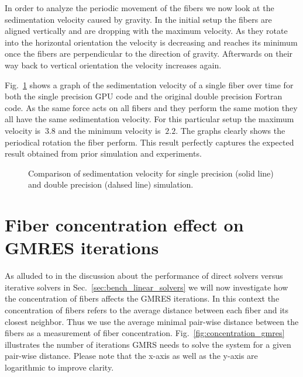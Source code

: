 In order to analyze the periodic movement of the fibers we now look at the sedimentation velocity caused by gravity. In the initial setup the fibers are aligned vertically and are dropping with the maximum velocity. As they rotate into the horizontal orientation the velocity is decreasing and reaches its minimum once the fibers are perpendicular to the direction of gravity. Afterwards on their way back to vertical orientation the velocity increases again.

Fig.~\ref{fig:ring_sedimentation_velocity} shows a graph of the sedimentation velocity of a single fiber over time for both the single precision GPU code and the original double precision Fortran code. As the same force acts on all fibers and they perform the same motion they all have the same sedimentation velocity. For this particular setup the maximum velocity is $~3.8$ and the minimum velocity is $~2.2$. The graphs clearly shows the periodical rotation the fiber perform. This result perfectly captures the expected result obtained from prior simulation and experiments.

\begin{figure}[!htbp]
  \centering
  \caption[Comparison of sedimentation velocity for single- and double-precision simulation.]{Comparison of sedimentation velocity for single precision (solid line) and double precision (dahsed line) simulation.}
  \label{fig:ring_sedimentation_velocity}
\end{figure}

\section{Fiber concentration effect on GMRES iterations}
\label{sec:example_concentration_gmres}

As alluded to in the discussion about the performance of direct solvers versus iterative solvers in Sec.~\ref{sec:bench_linear_solvers} we will now investigate how the concentration of fibers affects the GMRES iterations. In this context the concentration of fibers refers to the average distance between each fiber and its closest neighbor. Thus we use the average minimal pair-wise distance between the fibers as a measurement of fiber concentration. Fig.~\ref{fig:concentration_gmres} illustrates the number of iterations GMRS needs to solve the system for a given pair-wise distance. Please note that the x-axis as well as the y-axis are logarithmic to improve clarity.

